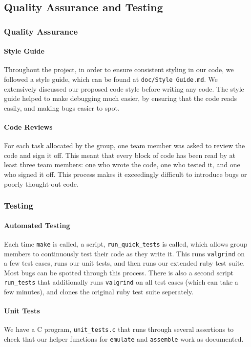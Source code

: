 \documentclass[10pt]{article}
\begin{document}
\subsection{Quality Assurance and Testing}

\subsubsection{Quality Assurance}

\paragraph{Style Guide}
Throughout the project, in order to ensure consistent styling in our code, we followed a style guide, which can be found at \texttt{doc/Style Guide.md}. We extensively discussed our proposed code style before writing any code. The style guide helped to make debugging much easier, by ensuring that the code reads easily, and making bugs easier to spot.

\paragraph{Code Reviews}
For each task allocated by the group, one team member was asked to review the code and sign it off. This meant that every block of code has been read by at least three team members: one who wrote the code, one who tested it, and one who signed it off. This process makes it exceedingly difficult to introduce bugs or poorly thought-out code.

\subsubsection{Testing}

\paragraph{Automated Testing}
Each time \texttt{make} is called, a script, \texttt{run\_quick\_tests} is called, which allows group members to continuously test their code as they write it. This runs \texttt{valgrind} on a few test cases, runs our unit tests, and then runs our extended ruby test suite. Most bugs can be spotted through this process. There is also a second script \texttt{run\_tests} that additionally runs \texttt{valgrind} on all test cases (which can take a few minutes), and clones the original ruby test suite seperately.

\paragraph{Unit Tests}
We have a C program, \texttt{unit\_tests.c} that runs through several assertions to check that our helper functions for \texttt{emulate} and \texttt{assemble} work as documented.
\end{document}
